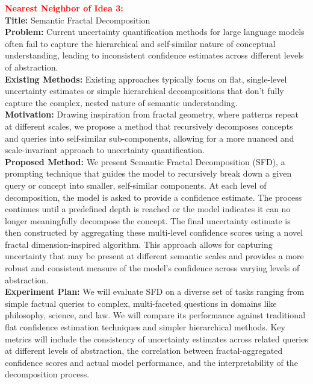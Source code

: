 \vspace{0.5em}

\textbf{\textcolor{red}{Nearest Neighbor of Idea 3:}} \\
\textbf{Title:} Semantic Fractal Decomposition \\
\textbf{Problem:} Current uncertainty quantification methods for large language models often fail to capture the hierarchical and self-similar nature of conceptual understanding, leading to inconsistent confidence estimates across different levels of abstraction. \\
\textbf{Existing Methods:} Existing approaches typically focus on flat, single-level uncertainty estimates or simple hierarchical decompositions that don't fully capture the complex, nested nature of semantic understanding. \\
\textbf{Motivation:} Drawing inspiration from fractal geometry, where patterns repeat at different scales, we propose a method that recursively decomposes concepts and queries into self-similar sub-components, allowing for a more nuanced and scale-invariant approach to uncertainty quantification. \\
\textbf{Proposed Method:} We present Semantic Fractal Decomposition (SFD), a prompting technique that guides the model to recursively break down a given query or concept into smaller, self-similar components. At each level of decomposition, the model is asked to provide a confidence estimate. The process continues until a predefined depth is reached or the model indicates it can no longer meaningfully decompose the concept. The final uncertainty estimate is then constructed by aggregating these multi-level confidence scores using a novel fractal dimension-inspired algorithm. This approach allows for capturing uncertainty that may be present at different semantic scales and provides a more robust and consistent measure of the model's confidence across varying levels of abstraction. \\
\textbf{Experiment Plan:} We will evaluate SFD on a diverse set of tasks ranging from simple factual queries to complex, multi-faceted questions in domains like philosophy, science, and law. We will compare its performance against traditional flat confidence estimation techniques and simpler hierarchical methods. Key metrics will include the consistency of uncertainty estimates across related queries at different levels of abstraction, the correlation between fractal-aggregated confidence scores and actual model performance, and the interpretability of the decomposition process.

